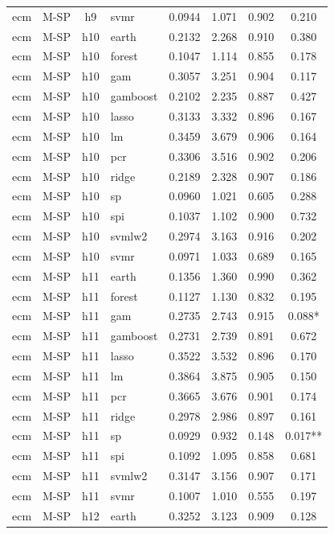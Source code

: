 \begin{ThreePartTable}
\begin{longtable}[t]{llclcccc}
ecm & M-SP & h9 & svmr & 0.0944 & 1.071 & 0.902 & 0.210\\
\addlinespace
ecm & M-SP & h10 & earth & 0.2132 & 2.268 & 0.910 & 0.380\\
ecm & M-SP & h10 & forest & 0.1047 & 1.114 & 0.855 & 0.178\\
ecm & M-SP & h10 & gam & 0.3057 & 3.251 & 0.904 & 0.117\\
ecm & M-SP & h10 & gamboost & 0.2102 & 2.235 & 0.887 & 0.427\\
ecm & M-SP & h10 & lasso & 0.3133 & 3.332 & 0.896 & 0.167\\
ecm & M-SP & h10 & lm & 0.3459 & 3.679 & 0.906 & 0.164\\
ecm & M-SP & h10 & pcr & 0.3306 & 3.516 & 0.902 & 0.206\\
ecm & M-SP & h10 & ridge & 0.2189 & 2.328 & 0.907 & 0.186\\
ecm & M-SP & h10 & sp & 0.0960 & 1.021 & 0.605 & 0.288\\
ecm & M-SP & h10 & spi & 0.1037 & 1.102 & 0.900 & 0.732\\
ecm & M-SP & h10 & svmlw2 & 0.2974 & 3.163 & 0.916 & 0.202\\
ecm & M-SP & h10 & svmr & 0.0971 & 1.033 & 0.689 & 0.165\\
\addlinespace
ecm & M-SP & h11 & earth & 0.1356 & 1.360 & 0.990 & 0.362\\
ecm & M-SP & h11 & forest & 0.1127 & 1.130 & 0.832 & 0.195\\
ecm & M-SP & h11 & gam & 0.2735 & 2.743 & 0.915 & 0.088*\\
ecm & M-SP & h11 & gamboost & 0.2731 & 2.739 & 0.891 & 0.672\\
ecm & M-SP & h11 & lasso & 0.3522 & 3.532 & 0.896 & 0.170\\
ecm & M-SP & h11 & lm & 0.3864 & 3.875 & 0.905 & 0.150\\
ecm & M-SP & h11 & pcr & 0.3665 & 3.676 & 0.901 & 0.174\\
ecm & M-SP & h11 & ridge & 0.2978 & 2.986 & 0.897 & 0.161\\
ecm & M-SP & h11 & sp & 0.0929 & 0.932 & 0.148 & 0.017**\\
ecm & M-SP & h11 & spi & 0.1092 & 1.095 & 0.858 & 0.681\\
ecm & M-SP & h11 & svmlw2 & 0.3147 & 3.156 & 0.907 & 0.171\\
ecm & M-SP & h11 & svmr & 0.1007 & 1.010 & 0.555 & 0.197\\
\addlinespace
ecm & M-SP & h12 & earth & 0.3252 & 3.123 & 0.909 & 0.128\\

\end{longtable}
\end{ThreePartTable}
